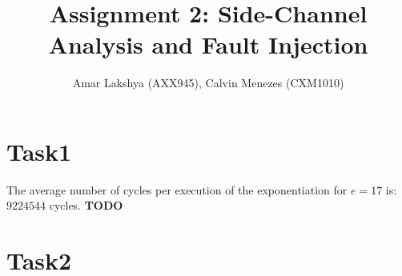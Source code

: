 \documentclass[1p,16pt]{elsarticle}
\begin{document}
\begin{frontmatter}



\title{Assignment 2: Side-Channel Analysis and Fault Injection}


\author{Amar Lakshya (AXX945), Calvin Menezes (CXM1010)}

\address{School of Computer Science, University of Birmingham}

%
%
%
%
\end{frontmatter}


\section{Task1}

The average number of cycles per execution of the exponentiation
for $\textit{e}=17$ is: \\
$9224544$ cycles.
\textbf{TODO}
\section{Task2}
\end{document}
